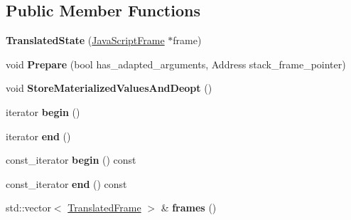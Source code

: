 \subsection*{Public Member Functions}
\begin{DoxyCompactItemize}
\item 
{\bfseries Translated\+State} (\hyperlink{classv8_1_1internal_1_1_java_script_frame}{Java\+Script\+Frame} $\ast$frame)\hypertarget{classv8_1_1internal_1_1_translated_state_ac913b72fcc5c226250fd6202713e2d13}{}\label{classv8_1_1internal_1_1_translated_state_ac913b72fcc5c226250fd6202713e2d13}

\item 
void {\bfseries Prepare} (bool has\+\_\+adapted\+\_\+arguments, Address stack\+\_\+frame\+\_\+pointer)\hypertarget{classv8_1_1internal_1_1_translated_state_a736913c863f957cae9227527c6a72d20}{}\label{classv8_1_1internal_1_1_translated_state_a736913c863f957cae9227527c6a72d20}

\item 
void {\bfseries Store\+Materialized\+Values\+And\+Deopt} ()\hypertarget{classv8_1_1internal_1_1_translated_state_a40462a969a13055032710c15374366b3}{}\label{classv8_1_1internal_1_1_translated_state_a40462a969a13055032710c15374366b3}

\item 
iterator {\bfseries begin} ()\hypertarget{classv8_1_1internal_1_1_translated_state_a0d7181aec0643e3c070248ee1429acf2}{}\label{classv8_1_1internal_1_1_translated_state_a0d7181aec0643e3c070248ee1429acf2}

\item 
iterator {\bfseries end} ()\hypertarget{classv8_1_1internal_1_1_translated_state_a3f7c5ec0be6c661c55a127993baf3e24}{}\label{classv8_1_1internal_1_1_translated_state_a3f7c5ec0be6c661c55a127993baf3e24}

\item 
const\+\_\+iterator {\bfseries begin} () const \hypertarget{classv8_1_1internal_1_1_translated_state_a6e4dbe28cc4c7d012c3124cc00ec06c7}{}\label{classv8_1_1internal_1_1_translated_state_a6e4dbe28cc4c7d012c3124cc00ec06c7}

\item 
const\+\_\+iterator {\bfseries end} () const \hypertarget{classv8_1_1internal_1_1_translated_state_a42c1fd6ead339be0318ebabcddbae3e5}{}\label{classv8_1_1internal_1_1_translated_state_a42c1fd6ead339be0318ebabcddbae3e5}

\item 
std\+::vector$<$ \hyperlink{classv8_1_1internal_1_1_translated_frame}{Translated\+Frame} $>$ \& {\bfseries frames} ()\hypertarget{classv8_1_1internal_1_1_translated_state_a0810bb0c912ff00d226d483cbad42a71}{}\label{classv8_1_1internal_1_1_translated_state_a0810bb0c912ff00d226d483cbad42a71}


\end{DoxyCompactItemize}
